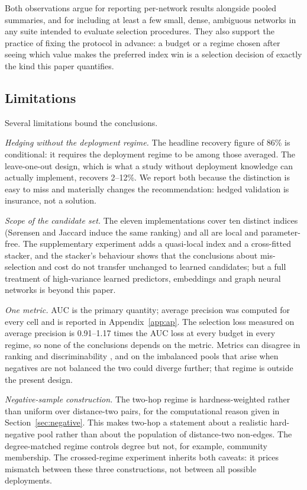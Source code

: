 \documentclass{comjnl}
\begin{document}
Both observations argue for reporting per-network results alongside pooled summaries, and for including at least a few small, dense, ambiguous networks in any suite intended to evaluate selection procedures. They also support the practice of fixing the protocol in advance: a budget or a regime chosen after seeing which value makes the preferred index win is a selection decision of exactly the kind this paper quantifies.

\subsection{Limitations}
\label{sec:limitations}

Several limitations bound the conclusions.

\emph{Hedging without the deployment regime.} The headline recovery figure of 86\% is conditional: it requires the deployment regime to be among those averaged. The leave-one-out design, which is what a study without deployment knowledge can actually implement, recovers 2--12\%. We report both because the distinction is easy to miss and materially changes the recommendation: hedged validation is insurance, not a solution.

\emph{Scope of the candidate set.} The eleven implementations cover ten distinct indices (S\o{}rensen and Jaccard induce the same ranking) and all are local and parameter-free. The supplementary experiment adds a quasi-local index and a cross-fitted stacker, and the stacker's behaviour shows that the conclusions about mis-selection and cost do not transfer unchanged to learned candidates; but a full treatment of high-variance learned predictors, embeddings and graph neural networks is beyond this paper.

\emph{One metric.} AUC is the primary quantity; average precision was computed for every cell and is reported in Appendix~\ref{app:ap}. The selection loss measured on average precision is 0.91--1.17 times the AUC loss at every budget in every regime, so none of the conclusions depends on the metric. Metrics can disagree in ranking and discriminability \citep{bi2024inconsistency,wan2025quantifying}, and on the imbalanced pools that arise when negatives are not balanced the two could diverge further; that regime is outside the present design.

\emph{Negative-sample construction.} The two-hop regime is hardness-weighted rather than uniform over distance-two pairs, for the computational reason given in Section~\ref{sec:negative}. This makes two-hop a statement about a realistic hard-negative pool rather than about the population of distance-two non-edges. The degree-matched regime controls degree but not, for example, community membership. The crossed-regime experiment inherits both caveats: it prices mismatch between these three constructions, not between all possible deployments.
\end{document}
